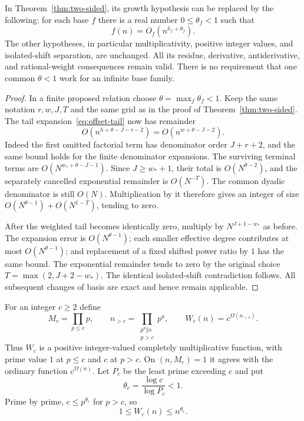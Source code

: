 \begin{lemma}
\label{lem:v5-sublinear-growth}
In Theorem~\ref{thm:two-sided}, its growth hypothesis can be replaced
by the following: for each base $f$ there is a real number
$0\leq\theta_f<1$ such that
\[
 f(n)=O_f(n^{h_f+\theta_f}).
\]
The other hypotheses, in particular multiplicativity, positive integer
values, and isolated-shift separation, are unchanged.  All its residue,
derivative, antiderivative, and rational-weight consequences remain valid.
There is no requirement that one common $\theta<1$ work for an infinite
base family.
\end{lemma}
\begin{proof}
In a finite proposed relation choose
$\theta=\max_f\theta_f<1$.  Keep the same notation $r,w,J,T$ and
the same grid as in the proof of Theorem~\ref{thm:two-sided}.
The tail expansion~\eqref{eq:offset-tail} now has remainder
\[
 O(n^{h+\theta-J-r-2})=O(n^{w+\theta-J-2}).
\]
Indeed the first omitted factorial term has denominator order
$J+r+2$, and the same bound holds for the finite denominator expansions.
The surviving terminal terms are
$O(N^{w_*+\theta-J-1})$.  Since $J\geq w_*+1$, their total is
$O(N^{\theta-2})$, and the separately cancelled exponential remainder
is $O(N^{-T})$.  The common dyadic denominator is still $O(N)$.
Multiplication by it therefore gives an integer of size
$O(N^{\theta-1})+O(N^{1-T})$, tending to zero.

After the weighted tail becomes identically zero, multiply by
$N^{J+1-w_*}$ as before.  The expansion error is
$O(N^{\theta-1})$; each smaller effective degree contributes at most
$O(N^{\theta-1})$; and replacement of a fixed shifted power ratio
by $1$ has the same bound.  The exponential remainder tends to zero
by the original choice $T=\max(2,J+2-w_*)$.
The identical isolated-shift contradiction follows.  All subsequent
changes of basis are exact and hence remain applicable.
\end{proof}

For an integer $c\geq2$ define
\[
 M_c=\prod_{p\leq c}p,\qquad
 n_{>c}=\prod_{\substack{p^a\Vert n\\p>c}}p^a,\qquad
 W_c(n)=c^{\Omega(n_{>c})}.
\]
Thus $W_c$ is a positive integer-valued completely multiplicative
function, with prime value $1$ at $p\leq c$ and $c$ at $p>c$.
On $(n,M_c)=1$ it agrees with the ordinary function $c^{\Omega(n)}$.
Let $P_c$ be the least prime exceeding $c$ and put
\[
 \theta_c=\frac{\log c}{\log P_c}<1.
\]
Prime by prime, $c\leq p^{\theta_c}$ for $p>c$, so
\begin{equation}\label{eq:v5-omega-growth}
 1\leq W_c(n)\leq n^{\theta_c}.
\end{equation}

